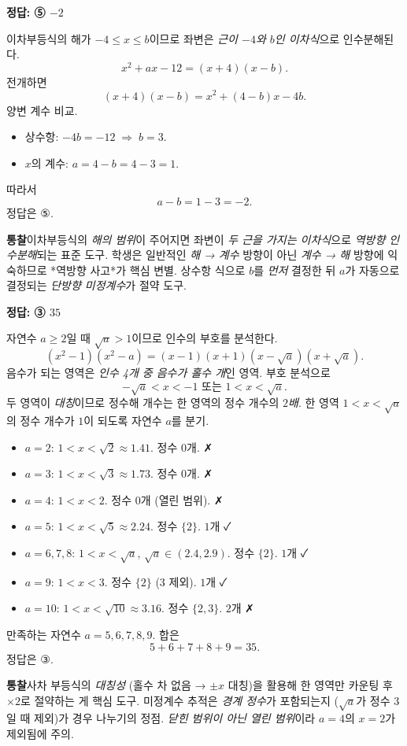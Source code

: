 \documentclass[10pt]{article}
\newcommand{\solnote}[1]{\par\smallskip\noindent
  \begin{tcolorbox}[enhanced, breakable, colback=vB-light, colframe=vB-light,
    boxrule=0pt, arc=3pt, left=10pt, right=10pt, top=4pt, bottom=4pt,
    fontupper=\sffamily\footnotesize\color{vB-ink}]
    \textbf{\color{vB-deep}통찰}\quad #1
  \end{tcolorbox}}
\begin{document}
\begin{answerbox}\sffamily\bfseries 정답: ⑤ $-2$\end{answerbox}
 이차부등식의 해가 $-4 \le x \le b$이므로 좌변은 \emph{근이 $-4$와 $b$인 이차식}으로 인수분해된다.
\[ x^2 + ax - 12 = (x + 4)(x - b). \]
 전개하면
\[ (x + 4)(x - b) = x^2 + (4 - b)x - 4b. \]
 양변 계수 비교.
\begin{itemize}\setlength{\itemsep}{0pt}
\item 상수항: $-4b = -12 \;\Longrightarrow\; b = 3$.
\item $x$의 계수: $a = 4 - b = 4 - 3 = 1$.
\end{itemize}
 따라서
\[ a - b = 1 - 3 = -2. \]
정답은 $\textbf{⑤}$.
\solnote{이차부등식의 \emph{해의 범위}이 주어지면 좌변이 \emph{두 근을 가지는 이차식}으로 \emph{역방향 인수분해}되는 표준 도구. 학생은 일반적인 \emph{해 → 계수} 방향이 아닌 \emph{계수 → 해} 방향에 익숙하므로 *역방향 사고*가 핵심 변별. 상수항 식으로 $b$를 \emph{먼저} 결정한 뒤 $a$가 자동으로 결정되는 \emph{단방향 미정계수}가 절약 도구.}

\begin{answerbox}\sffamily\bfseries 정답: ③ $35$\end{answerbox}
 자연수 $a \ge 2$일 때 $\sqrt{a} > 1$이므로 인수의 부호를 분석한다.
\[ (x^2 - 1)(x^2 - a) = (x - 1)(x + 1)(x - \sqrt{a})(x + \sqrt{a}). \]
 음수가 되는 영역은 \emph{인수 4개 중 음수가 홀수 개}인 영역. 부호 분석으로
\[ -\sqrt{a} < x < -1 \text{ 또는 } 1 < x < \sqrt{a}. \]
 두 영역이 \emph{대칭}이므로 정수해 개수는 한 영역의 정수 개수의 \emph{$2$배}.
 한 영역 $1 < x < \sqrt{a}$의 정수 개수가 $1$이 되도록 자연수 $a$를 분기.
\begin{itemize}\setlength{\itemsep}{0pt}
\item $a = 2$: $1 < x < \sqrt{2} \approx 1.41$. 정수 $0$개. ✗
\item $a = 3$: $1 < x < \sqrt{3} \approx 1.73$. 정수 $0$개. ✗
\item $a = 4$: $1 < x < 2$. 정수 $0$개 (열린 범위). ✗
\item $a = 5$: $1 < x < \sqrt{5} \approx 2.24$. 정수 $\{2\}$. $1$개 ✓
\item $a = 6, 7, 8$: $1 < x < \sqrt{a}$, $\sqrt{a} \in (2.4, 2.9)$. 정수 $\{2\}$. $1$개 ✓
\item $a = 9$: $1 < x < 3$. 정수 $\{2\}$ (3 제외). $1$개 ✓
\item $a = 10$: $1 < x < \sqrt{10} \approx 3.16$. 정수 $\{2, 3\}$. $2$개 ✗
\end{itemize}
 만족하는 자연수 $a = 5, 6, 7, 8, 9$. 합은
\[ 5 + 6 + 7 + 8 + 9 = 35. \]
정답은 $\textbf{③}$.
\solnote{사차 부등식의 \emph{대칭성} (홀수 차 없음 → $\pm x$ 대칭)을 활용해 한 영역만 카운팅 후 $\times 2$로 절약하는 게 핵심 도구. 미정계수 추적은 \emph{경계 정수}가 포함되는지 ($\sqrt{a}$가 정수 $3$일 때 제외)가 경우 나누기의 정점. \emph{닫힌 범위이 아닌 열린 범위}이라 $a = 4$의 $x = 2$가 제외됨에 주의.}
\end{document}
